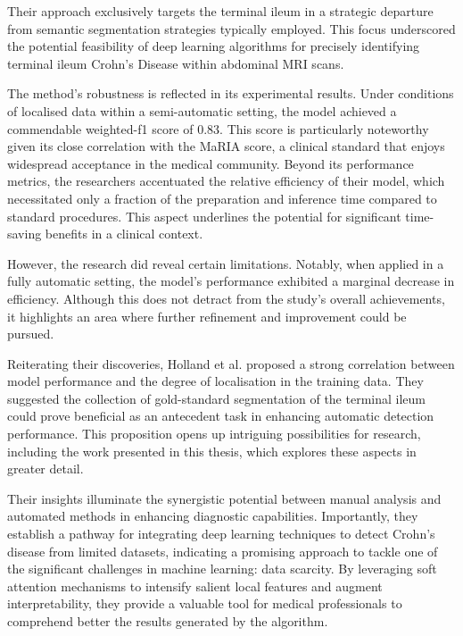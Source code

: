 Their approach exclusively targets the terminal ileum in a strategic departure from semantic segmentation strategies typically employed. This focus underscored the potential feasibility of deep learning algorithms for precisely identifying terminal ileum Crohn's Disease within abdominal MRI scans.

The method's robustness is reflected in its experimental results. Under conditions of localised data within a semi-automatic setting, the model achieved a commendable weighted-f1 score of 0.83. This score is particularly noteworthy given its close correlation with the MaRIA \cite{rimola2009magnetic} score, a clinical standard that enjoys widespread acceptance in the medical community. Beyond its performance metrics, the researchers accentuated the relative efficiency of their model, which necessitated only a fraction of the preparation and inference time compared to standard procedures. This aspect underlines the potential for significant time-saving benefits in a clinical context.

However, the research did reveal certain limitations. Notably, when applied in a fully automatic setting, the model's performance exhibited a marginal decrease in efficiency. Although this does not detract from the study's overall achievements, it highlights an area where further refinement and improvement could be pursued.

Reiterating their discoveries, Holland et al. proposed a strong correlation between model performance and the degree of localisation in the training data. They suggested the collection of gold-standard segmentation of the terminal ileum could prove beneficial as an antecedent task in enhancing automatic detection performance. This proposition opens up intriguing possibilities for research, including the work presented in this thesis, which explores these aspects in greater detail.

Their insights illuminate the synergistic potential between manual analysis and automated methods in enhancing diagnostic capabilities. Importantly, they establish a pathway for integrating deep learning techniques to detect Crohn's disease from limited datasets, indicating a promising approach to tackle one of the significant challenges in machine learning: data scarcity. By leveraging soft attention mechanisms to intensify salient local features and augment interpretability, they provide a valuable tool for medical professionals to comprehend better the results generated by the algorithm.

